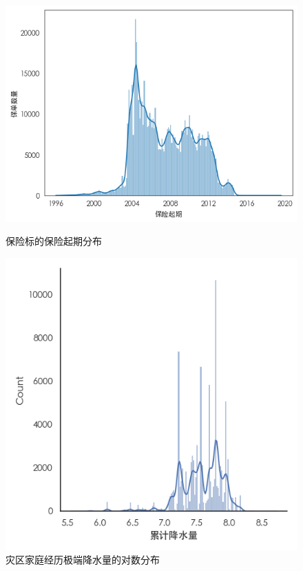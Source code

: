 \begin{figure}[H]
    \begin{minipage}{0.48\linewidth}
        \includegraphics[width=\linewidth]{img/insurance.png}
        \caption{保险标的保险起期分布}
    \end{minipage}
    \begin{minipage}{0.48\linewidth}
        \includegraphics[width=\linewidth]{lib/img/precip.png}
        \caption{灾区家庭经历极端降水量的对数分布}
    \end{minipage}
\end{figure}


